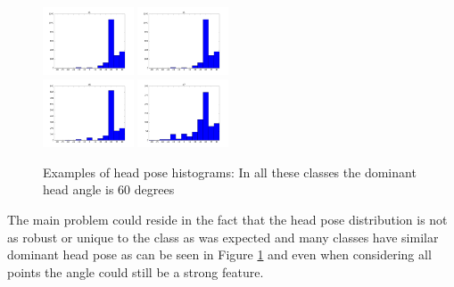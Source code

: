 \documentclass[10pt,twocolumn,letterpaper]{article}
\begin{document}
\begin{figure}[h]
	\centering
	\includegraphics[width=0.24\textwidth]{headpose_evaluation_c1}%
	\includegraphics[width=0.24\textwidth]{headpose_evaluation_c1}\\ \vspace{0.01\textwidth}
	\includegraphics[width=0.24\textwidth]{headpose_evaluation_c6}%
	\includegraphics[width=0.24\textwidth]{headpose_evaluation_c7}
	\caption{Examples of head pose histograms: In all these classes the dominant head angle is 60 degrees}
	\label{head_pose_distribution}
\end{figure}

The main problem could reside in the fact that the head pose distribution is not as robust or unique to the class as was expected and many classes have similar dominant head pose as can be seen in Figure \ref{head_pose_distribution} and even when considering all points the angle could still be a strong feature. 
\end{document}
